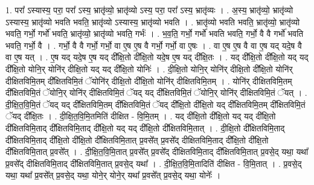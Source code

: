 \documentclass[17pt]{extarticle}
\begin{document}
1. परा᳚ ऽस्यास्य॒ परा॒ परा᳚ ऽस्य॒ भ्रातृ॑व्यो॒ भ्रातृ॑व्यो ऽस्य॒ परा॒ परा᳚ ऽस्य॒ भ्रातृ॑व्यः । . अ॒स्य॒ भ्रातृ॑व्यो॒ भ्रातृ॑व्यो ऽस्यास्य॒ भ्रातृ॑व्यो भवति भवति॒ भ्रातृ॑व्यो ऽस्यास्य॒ भ्रातृ॑व्यो भवति । . भ्रातृ॑व्यो भवति भवति॒ भ्रातृ॑व्यो॒ भ्रातृ॑व्यो भवति॒ गर्भो॒ गर्भो॑ भवति॒ भ्रातृ॑व्यो॒ भ्रातृ॑व्यो भवति॒ गर्भः॑ । . भ॒व॒ति॒ गर्भो॒ गर्भो॑ भवति भवति॒ गर्भो॒ वै वै गर्भो॑ भवति भवति॒ गर्भो॒ वै । . गर्भो॒ वै वै गर्भो॒ गर्भो॒ वा ए॒ष ए॒ष वै गर्भो॒ गर्भो॒ वा ए॒षः । . वा ए॒ष ए॒ष वै वा ए॒ष यद् यदे॒ष वै वा ए॒ष यत् । . ए॒ष यद् यदे॒ष ए॒ष यद् दी᳚क्षि॒तो दी᳚क्षि॒तो यदे॒ष ए॒ष यद् दी᳚क्षि॒तः । . यद् दी᳚क्षि॒तो दी᳚क्षि॒तो यद् यद् दी᳚क्षि॒तो योनि॒र् योनि॑र् दीक्षि॒तो यद् यद् दी᳚क्षि॒तो योनिः॑ । . दी॒क्षि॒तो योनि॒र् योनि॑र् दीक्षि॒तो दी᳚क्षि॒तो योनि॑र् दीक्षितविमि॒तम् दी᳚क्षितविमि॒तं ॅयोनि॑र् दीक्षि॒तो दी᳚क्षि॒तो योनि॑र् दीक्षितविमि॒तम् । . योनि॑र् दीक्षितविमि॒तम् दी᳚क्षितविमि॒तं ॅयोनि॒र् योनि॑र् दीक्षितविमि॒तं ॅयद् यद् दी᳚क्षितविमि॒तं ॅयोनि॒र् योनि॑र् दीक्षितविमि॒तं ॅयत् । . दी॒क्षि॒त॒वि॒मि॒तं ॅयद् यद् दी᳚क्षितविमि॒तम् दी᳚क्षितविमि॒तं ॅयद् दी᳚क्षि॒तो दी᳚क्षि॒तो यद् दी᳚क्षितविमि॒तम् दी᳚क्षितविमि॒तं ॅयद् दी᳚क्षि॒तः । . दी॒क्षि॒त॒वि॒मि॒तमिति॑ दीक्षित - वि॒मि॒तम् । . यद् दी᳚क्षि॒तो दी᳚क्षि॒तो यद् यद् दी᳚क्षि॒तो दी᳚क्षितविमि॒ताद् दी᳚क्षितविमि॒ताद् दी᳚क्षि॒तो यद् यद् दी᳚क्षि॒तो दी᳚क्षितविमि॒तात् । . दी॒क्षि॒तो दी᳚क्षितविमि॒ताद् दी᳚क्षितविमि॒ताद् दी᳚क्षि॒तो दी᳚क्षि॒तो दी᳚क्षितविमि॒तात् प्र॒वसे᳚त् प्र॒वसे᳚द् दीक्षितविमि॒ताद् दी᳚क्षि॒तो दी᳚क्षि॒तो दी᳚क्षितविमि॒तात् प्र॒वसे᳚त् । . दी॒क्षि॒त॒वि॒मि॒तात् प्र॒वसे᳚त् प्र॒वसे᳚द् दीक्षितविमि॒ताद् दी᳚क्षितविमि॒तात् प्र॒वसे॒द् यथा॒ यथा᳚ प्र॒वसे᳚द् दीक्षितविमि॒ताद् दी᳚क्षितविमि॒तात् प्र॒वसे॒द् यथा᳚ । . दी॒क्षि॒त॒वि॒मि॒तादिति॑ दीक्षित - वि॒मि॒तात् । . प्र॒वसे॒द् यथा॒ यथा᳚ प्र॒वसे᳚त् प्र॒वसे॒द् यथा॒ योने॒र् योने॒र् यथा᳚ प्र॒वसे᳚त् प्र॒वसे॒द् यथा॒ योनेः᳚ । \newline
\end{document}
